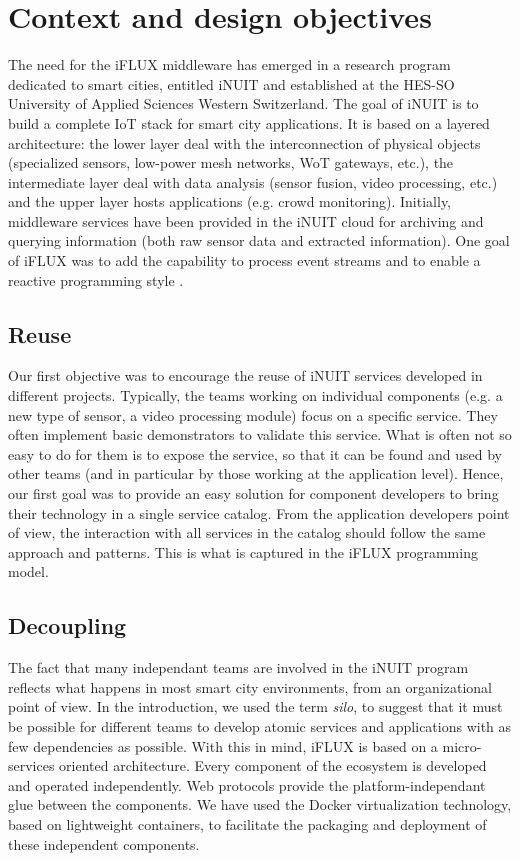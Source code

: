 \section{Context and design objectives}

The need for the iFLUX middleware has emerged in a research program dedicated to smart cities, entitled iNUIT and established at the HES-SO University of Applied Sciences Western Switzerland. The goal of iNUIT is to build a complete IoT stack for smart city applications. It is based on a layered architecture: the lower layer deal with the interconnection of physical objects (specialized sensors, low-power mesh networks, WoT gateways, etc.), the intermediate layer deal with data analysis (sensor fusion, video processing, etc.) and the upper layer hosts applications (e.g. crowd monitoring). Initially, middleware services have been provided in the iNUIT cloud for archiving and querying information (both raw sensor data and extracted information). One goal of iFLUX was to add the capability to process event streams and to enable a reactive programming style \cite{reactive}.

\subsection{Reuse}

Our first objective was to encourage the reuse of iNUIT services developed in different projects. Typically, the teams working on individual components (e.g. a new type of sensor, a video processing module) focus on a specific service. They often implement basic demonstrators to validate this service. What is often not so easy to do for them is to expose the service, so that it can be found and used by other teams (and in particular by those working at the application level). Hence, our first goal was to provide an easy solution for component developers to bring their technology in a single service catalog. From the application developers point of view, the interaction with all services in the catalog should follow the same approach and patterns. This is what is captured in the iFLUX programming model.

\subsection{Decoupling}

The fact that many independant teams are involved in the iNUIT program reflects what happens in most smart city environments, from an organizational point of view. In the introduction, we used the term \emph{silo}, to suggest that it must be possible for different teams to develop atomic services and applications with as few dependencies as possible. With this in mind, iFLUX is based on a micro-services oriented architecture. Every component of the ecosystem is developed and operated independently. Web protocols provide the platform-independant glue between the components. We have used the Docker virtualization technology, based on lightweight containers, to facilitate the packaging and deployment of these independent components.

